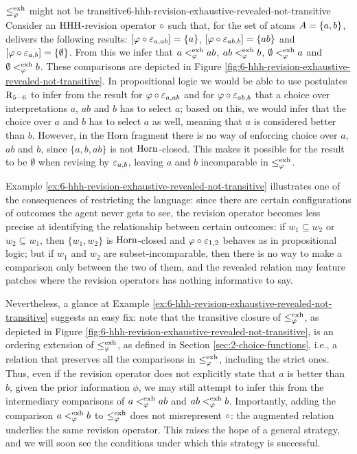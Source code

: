 \begin{xmpl}{$\le^{{\operatorname{exh}}}_{\varphi}$ might not be transitive}{6-hhh-revision-exhaustive-revealed-not-transitive}
	Consider an ${\mathrm{HHH}}$-revision operator $\circ$ such that,
	for the set of atoms $A=\{a,b\}$,
	delivers the following results:
	$[\varphi\circ\varepsilon_{a,ab}]=\{a\}$,
	$[\varphi\circ\varepsilon_{ab,b}]=\{ab\}$
	and
	$[\varphi\circ\varepsilon_{a,b}]=\{\emptyset\}$.
	From this we infer that 
	$a<^{{\operatorname{exh}}}_{\varphi} ab$,
	$ab <^{{\operatorname{exh}}}_{\varphi} b$, 
	$\emptyset <^{{\operatorname{exh}}}_{\varphi} a$
	and 
	$\emptyset <^{{\operatorname{exh}}}_{\varphi} b$.
	These comparisons are depicted in 
	Figure \ref{fig:6-hhh-revision-exhaustive-revealed-not-transitive}.
	In propositional logic we would be able to use 
	postulates $\mathrm{R}_{5-6}$ to infer from
	the result for $\varphi\circ\varepsilon_{a,ab}$ and for
	$\varphi\circ\varepsilon_{ab,b}$
	that a choice over interpretations $a$, $ab$ and $b$
	has to select $a$;
	based on this, we would infer that the choice over $a$ and $b$
	has to select $a$ as well, meaning that $a$ is considered better 
	than $b$.
	However, in the Horn fragment there is no way of 
	enforcing choice over $a$, $ab$ and $b$,
	since $\{a,b,ab\}$ is not $\mathrm{Horn}$-closed.
	This makes it possible for the result to be $\emptyset$
	when revising by $\varepsilon_{a,b}$,
	leaving $a$ and $b$ incomparable in $\le^{{\operatorname{exh}}}_{\varphi}$.
\end{xmpl}

Example \ref{ex:6-hhh-revision-exhaustive-revealed-not-transitive}
illustrates one of the consequences of restricting the
language: since there are certain configurations 
of outcomes the agent never gets to see,
the revision operator
becomes less precise at identifying the relationship 
between certain outcomes:
if $w_1\subseteq w_2$ or $w_2 \subseteq w_1$, 
then $\{w_1,w_2\}$ is $\mathrm{Horn}$-closed and $\varphi\circ\varepsilon_{1,2}$
behaves as in propositional logic;
but if $w_1$ and $w_2$ are subset-incomparable,
then there is no way to make a comparison only between the two of them,
and the revealed relation may feature patches where
the revision operators has nothing informative to say.

Nevertheless, a glance at
Example \ref{ex:6-hhh-revision-exhaustive-revealed-not-transitive}
suggests an easy fix:
note that the transitive closure of $\le^{{\operatorname{exh}}}_{\varphi}$,
as depicted in Figure \ref{fig:6-hhh-revision-exhaustive-revealed-not-transitive},
is an ordering extension of $\le^{{\operatorname{exh}}}_{\varphi}$, as defined in Section \ref{sec:2-choice-functions},
i.e., a relation that preserves all the comparisons
in $\le^{{\operatorname{exh}}}_{\varphi}$, including the strict ones.
Thus, even if the revision operator does not explicitly state
that $a$ is better than $b$, given the prior information $\phi$,
we may still attempt to infer this from the intermediary comparisons 
of $a<^{{\operatorname{exh}}}_{\varphi} ab$ and $ab <^{{\operatorname{exh}}}_{\varphi} b$.
Importantly, adding the comparison $a <^{{\operatorname{exh}}}_{\varphi} b$
to $\le^{{\operatorname{exh}}}_{\varphi}$ does not misrepresent $\circ$: 
the augmented relation underlies the same revision operator.
This raises the hope of a general strategy,
and we will soon see the conditions under which this strategy is successful.

